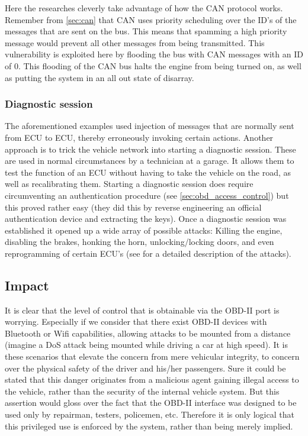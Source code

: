 Here the researches cleverly take advantage of how the CAN protocol works. Remember from \ref{sec:can} that CAN uses priority scheduling over the ID's of the messages that are sent on the bus. This means that spamming a high priority message would prevent all other messages from being transmitted. This vulnerability is exploited here by flooding the bus with CAN messages with an ID of 0. This flooding of the CAN bus halts the engine from being turned on, as well as putting the system in an all out state of disarray.

\subsubsection{Diagnostic session} 
\label{subsec:diagnostic_session}

The aforementioned examples used injection of messages that are normally sent from ECU to ECU, thereby erroneously invoking certain actions. Another approach is to trick the vehicle network into starting a diagnostic session. These are used in normal circumstances by a technician at a garage. It allows them to test the function of an ECU without having to take the vehicle on the road, as well as recalibrating them. Starting a diagnostic session does require circumventing an authentication procedure (see \ref{sec:obd_access_control}) but this proved rather easy (they did this by reverse engineering an official authentication device and extracting the keys). Once a diagnostic session was established it opened up a wide array of possible attacks: Killing the engine, disabling the brakes, honking the horn, unlocking/locking doors, and even reprogramming of certain ECU's (see \cite{MillerC} for a detailed description of the attacks).

\subsection{Impact}
\label{subsec:impact}

It is clear that the level of control that is obtainable via the OBD-II port is worrying. Especially if we consider that there exist OBD-II devices with Bluetooth or Wifi capabilities, allowing attacks to be mounted from a distance (imagine a DoS attack being mounted while driving a car at high speed). It is these scenarios that elevate the concern from mere vehicular integrity, to concern over the physical safety of the driver and his/her passengers. Sure it could be stated that this danger originates from a malicious agent gaining illegal access to the vehicle, rather than the security of the internal vehicle system. But this assertion would gloss over the fact that the OBD-II interface was designed to be used only by repairman, testers, policemen, etc. Therefore it is only logical that this privileged use is enforced by the system, rather than being merely implied.

